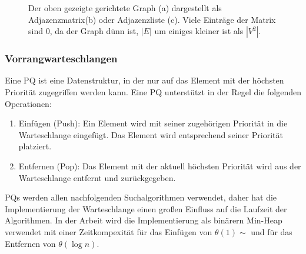 \begin{figure}[H]
\begin{subfigure}[b]{0.3\textwidth}
        \vspace{1em}
        \caption{}
    \end{subfigure}
    \caption[Graph als Adjazenzmatrix und Adjazenzliste]{Der oben gezeigte gerichtete Graph (a) dargestellt als Adjazenzmatrix(b) oder
        Adjazenzliste (c). Viele Einträge der Matrix sind 0, da der Graph dünn ist, \dH $|E|$
        um einiges kleiner ist als $|V^2|$.}
    \label{fig:graph_ex1}
\end{figure}

\subsubsection{Vorrangwarteschlangen}
Eine \ac{PQ} ist eine Datenstruktur, in der nur auf das Element mit der höchsten Priorität
zugegriffen werden kann. Eine \ac{PQ} unterstützt in der Regel die folgenden Operationen:
\begin{enumerate}
    \item Einfügen (Push): Ein Element wird mit seiner zugehörigen Priorität in die Warteschlange
          eingefügt. Das Element wird entsprechend seiner Priorität platziert.
    \item Entfernen (Pop): Das Element mit der aktuell höchsten Priorität wird aus der Warteschlange
          entfernt und zurückgegeben.
\end{enumerate}
\ac{PQ}s werden allen nachfolgenden Suchalgorithmen verwendet, daher hat die Implementierung der
Warteschlange einen großen Einfluss auf die Laufzeit der Algorithmen. In der Arbeit wird die
Implementierung als binärern Min-Heap verwendet mit einer Zeitkompexität für das Einfügen von
$\theta(1)\sim$ und für das Entfernen von $\theta(\log n)$.

